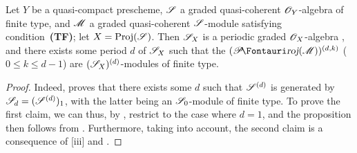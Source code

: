 \begin{proposition}[8.14.14]
\label{II.8.14.14}
Let $Y$ be a quasi-compact prescheme, $\mathscr{S}$ a graded quasi-coherent $\mathscr{O}_Y$-algebra of finite type, and $\mathscr{M}$ a graded quasi-coherent $\mathscr{S}$-module satisfying condition~\textbf{(TF)};
let $X=\operatorname{Proj}(\mathscr{S})$.
Then $\mathscr{S}_X$ is a periodic graded $\mathscr{O}_X$-algebra , and there exists
some period $d$ of $\mathscr{S}_X$ such that the $(\shProj(\sh{M}))^{(d,k)}$ ($0\leq k\leq d-1$) are $(\mathscr{S}_X)^{(d)}$-modules of finite type.
\end{proposition}

\begin{proof}
Indeed,  proves that there exists some $d$ such that $\mathscr{S}^{(d)}$ is generated by $\mathscr{S}_d=(\mathscr{S}^{(d)})_1$, with the latter being an $\mathscr{S}_0$-module of finite type.
To prove the first claim, we can thus, by , restrict to the case where $d=1$, and the proposition then follows from .
Furthermore, taking  into account, the second claim is a consequence of [iii] and .
\end{proof}

